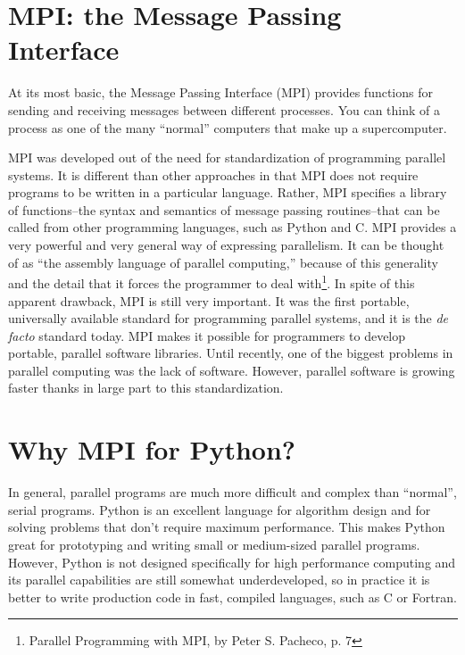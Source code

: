 \section*{MPI: the Message Passing Interface} At its most basic, the Message
Passing Interface (MPI) provides functions for sending and receiving messages
between different processes. You can think of a process as one of the many
``normal'' computers that make up a supercomputer.

MPI was developed out of the need for standardization of programming parallel
systems. It is different than other approaches in that MPI does not require
programs to be written in a particular language. Rather, MPI specifies a library
of functions--the syntax and semantics of message passing routines--that can be
called from other programming languages, such as Python and C. MPI provides a
very powerful and very general way of expressing parallelism. It can be thought
of as ``the assembly language of parallel computing,'' because of this
generality and the detail that it forces the programmer to deal
with\footnote{Parallel Programming with MPI, by Peter S. Pacheco, p. 7}. In
spite of this apparent drawback, MPI is still very important. It was the first
portable, universally available standard for programming parallel systems, and
it is the \emph{de facto} standard today. MPI makes it possible for programmers
to develop portable, parallel software libraries. Until recently, one of the
biggest problems in parallel computing was the lack of software. However,
parallel software is growing faster thanks in large part to this
standardization.


\section*{Why MPI for Python?} In general, parallel programs are much more
difficult and complex than ``normal'', serial programs. Python is an excellent
language for algorithm design and for solving problems that don't require
maximum performance. This makes Python great for prototyping and writing small
or medium-sized parallel programs. However, Python is not designed specifically
for high performance computing and its parallel capabilities are still somewhat
underdeveloped, so in practice it is better to write production code in fast,
compiled languages, such as C or Fortran.

